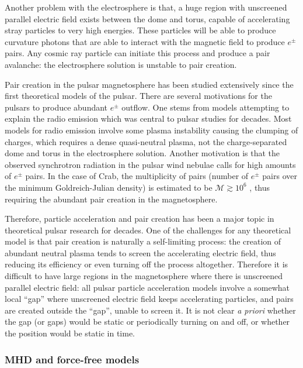 Another problem with the electrosphere is that, a huge region with unscreened
parallel electric field exists between the dome and torus, capable of
accelerating stray particles to very high energies. These particles will be able
to produce curvature photons that are able to interact with the magnetic field
to produce $e^{\pm}$ pairs. Any cosmic ray particle can initiate this process
and produce a pair avalanche: the electrosphere solution is
unstable to pair creation.

Pair creation in the pulsar magnetosphere has been studied extensively since the
first theoretical models of the pulsar. There are several motivations for the
pulsars to produce abundant $e^{\pm}$ outflow. One stems from models attempting
to explain the radio emission which was central to pulsar studies for decades.
Most models for radio emission involve some plasma instability causing the
clumping of charges, which requires a dense quasi-neutral plasma, not the
charge-separated dome and torus in the electrosphere solution. Another
motivation is that the observed synchrotron radiation in the pulsar wind nebulae
calls for high amounts of $e^{\pm}$ pairs. In the case of Crab, the multiplicity
of pairs (number of $e^{\pm}$ pairs over the minimum Goldreich-Julian density)
is estimated to be $\mathcal{M} \gtrsim 10^{6}$ \citep{de_jager_gamma-ray_1996},
thus requiring the abundant pair creation in the magnetosphere.

Therefore, particle acceleration and pair creation has been a major topic in
theoretical pulsar research for decades. One of the challenges for any
theoretical model is that pair creation is naturally a self-limiting process:
the creation of abundant neutral plasma tends to screen the accelerating electric
field, thus reducing its efficiency or even turning off the process altogether.
Therefore it is difficult to have large regions in the magnetosphere where there
is unscreened parallel electric field: all pulsar particle acceleration models
involve a somewhat local ``gap'' where unscreened electric field keeps
accelerating particles, and pairs are created outside the ``gap'', unable to
screen it. It is not clear {\it a priori} whether the gap (or gaps) would be
static or periodically turning on and off, or whether the position would be
static in time.

\subsubsection{MHD and force-free models}
\label{sec:mhd-force-free}

